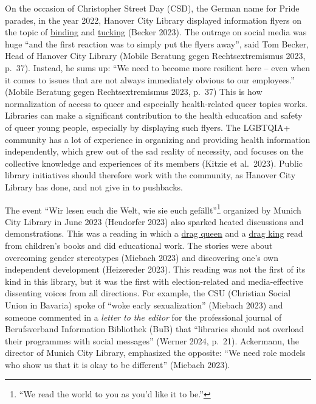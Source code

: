\documentclass[a4paper,
fontsize=11pt,
oneside,
numbers=noperiodatend,
parskip=half-,
bibliography=totoc,
final
]{scrartcl}
\begin{document}
On the occasion of Christopher Street Day (CSD), the German name for
Pride parades, in the year 2022, Hanover City Library displayed
information flyers on the topic of
\href{https://trans.fandom.com/wiki/Binding}{binding} and
\href{https://trans.fandom.com/wiki/Tucking}{tucking} (Becker 2023). The
outrage on social media was huge \enquote{and the first reaction was to simply
put the flyers away}, said Tom Becker, Head of Hanover City Library
(Mobile Beratung gegen Rechtsextremismus 2023, p.~37). Instead, he sums
up: \enquote{We need to become more resilient here -- even when it comes to
issues that are not always immediately obvious to our employees.}
(Mobile Beratung gegen Rechtsextremismus 2023, p.~37) This is how
normalization of access to queer and especially health-related queer
topics works. Libraries can make a significant contribution to the
health education and safety of queer young people, especially by
displaying such flyers. The LGBTQIA+ community has a lot of experience
in organizing and providing health information independently, which grew
out of the sad reality of necessity, and focuses on the collective
knowledge and experiences of its members (Kitzie et al.~2023). Public
library initiatives should therefore work with the community, as Hanover
City Library has done, and not give in to pushbacks.

The event \enquote{Wir lesen euch die Welt, wie sie euch gefällt}\footnote{\enquote{We
  read the world to you as you'd like it to be.}}
organized by Munich City Library in June 2023 (Heudorfer 2023) also
sparked heated discussions and demonstrations. This was a reading in
which a
\href{https://dictionary.cambridge.org/de/worterbuch/englisch/drag-queen}{drag
queen} and a
\href{https://dictionary.cambridge.org/de/worterbuch/englisch/drag-king}{drag
king} read from children's books and did educational
work. The stories were about overcoming gender stereotypes (Miebach
2023) and discovering one's own independent development
(Heizereder 2023). This reading was not the first of its kind in this
library, but it was the first with election-related and media-effective
dissenting voices from all directions. For example, the CSU (Christian
Social Union in Bavaria) spoke of \enquote{woke early sexualization} (Miebach
2023) and someone commented in a \emph{letter to the editor} for the
professional journal of Berufsverband Information Bibliothek (BuB) that
\enquote{libraries should not overload their programmes with social messages}
(Werner 2024, p.~21). Ackermann, the director of Munich City Library,
emphasized the opposite: \enquote{We need role models who show us that it is
okay to be different} (Miebach 2023).
\end{document}
